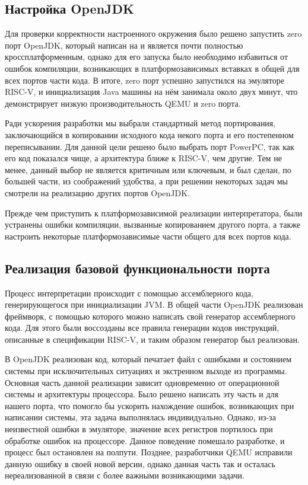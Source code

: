     
\subsection{Настройка OpenJDK}

Для проверки корректности настроенного окружения было решено запустить zero порт OpenJDK, который написан на \cpp и является почти полностью кроссплатформенным, однако для его запуска было необходимо избавиться от ошибок компиляции, возникающих в платформозависимых вставках в общей для всех портов части кода. В итоге, zero порт успешно запустился на эмуляторе RISC-V, и инициализация Java машины на нём занимала около двух минут, что демонстрирует низкую производительность QEMU и zero порта.


Ради ускорения разработки мы выбрали стандартный метод портирования, заключающийся в копировании исходного кода некого порта и его постепенном переписывании. Для данной цели решено было выбрать порт PowerPC, так как его код показался чище, а архитектура ближе к RISC-V, чем другие. Тем не менее, данный выбор не является критичным или ключевым, и был сделан, по большей части, из соображений удобства, а при решении некоторых задач мы смотрели на реализацию других портов OpenJDK.

Прежде чем приступить к платформозависимой реализации интерпретатора, были устранены ошибки компиляции, вызванные копированием другого порта, а также настроить некоторые платформозависимые части общего для всех портов кода.


\subsection{Реализация базовой функциональности порта}

Процесс интерпретации происходит с помощью ассемблерного кода, генерирующегося при инициализации JVM. В общей части OpenJDK реализован фреймворк, с помощью которого можно написать свой генератор ассемблерного кода. Для этого были воссозданы все правила генерации кодов инструкций, описанные в спецификации RISC-V, и таким образом генератор был реализован. 

В OpenJDK реализован код, который печатает файл с ошибками и состоянием системы при исключительных ситуациях и экстренном выходе из программы. Основная часть данной реализации зависит одновременно от операционной системы и архитектуры процессора. Было решено написать эту часть и для нашего порта, что помогло бы ускорить нахождение ошибок, возникающих при написании системы, эта задача выполнялась индивидуально. Однако, из-за неизвестной ошибки в эмуляторе, значение всех регистров портилось при обработке ошибок на процессоре. Данное поведение помешало разработке, и процесс был остановлен на полпути. Позднее, разработчики QEMU исправили данную ошибку в своей новой версии, однако данная часть так и осталась нереализованной в связи с более важными возникающими задачи.


